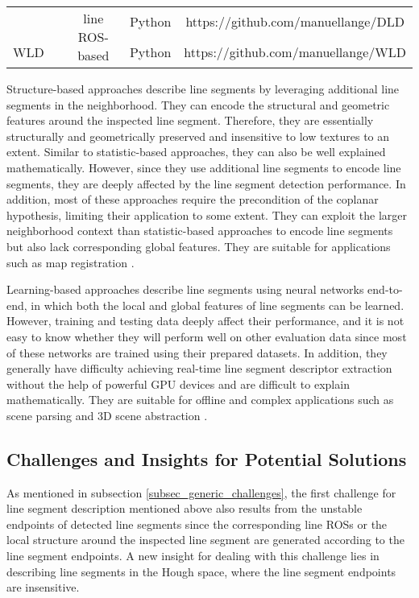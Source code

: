 \documentclass[journal,compsoc]{IEEEtran}
\begin{document}
\begin{table*}[tbp]
\begin{tabular}{|c|c|c|c|c|}
                                           &                                  & \multirow{2}{*}{line ROS-based}          & Python                   & https://github.com/manuellange/DLD                       \\ \cline{1-1} \cline{4-5}  		WLD  \cite{WLD}                                                                                       &                                  &                                          & Python                   & https://github.com/manuellange/WLD                       \\ \hline 	
	\end{tabular}%
	\label{line_description_implementation} 
\end{table*}

Structure-based approaches describe line segments by leveraging additional line segments in the neighborhood. They can encode the structural and geometric features around the inspected line segment. Therefore, they are essentially structurally and geometrically preserved and insensitive to low textures to an extent. Similar to statistic-based approaches, they can also be well explained mathematically. However, since they use additional line segments to encode line segments, they are deeply affected by the line segment detection performance. In addition, most of these approaches require the precondition of the coplanar hypothesis, limiting their application to some extent. They can exploit the larger neighborhood context than statistic-based approaches to encode line segments but also lack corresponding global features. They are suitable for applications such as map registration \cite{NovelSimilarityInvariantLineDescriptorandMatchingAlgorithmforGlobalMotionEstimation}.

Learning-based approaches describe line segments using neural networks end-to-end, in which both the local and global features of line segments can be learned. However, training and testing data deeply affect their performance, and it is not easy to know whether they will perform well on other evaluation data since most of these networks are trained using their prepared datasets. In addition, they generally have difficulty achieving real-time line segment descriptor extraction without the help of powerful GPU devices and are difficult to explain mathematically. They are suitable for offline and complex applications such as scene parsing \cite{6619245} and 3D scene abstraction \cite{HOFER2017167}.


\subsection{Challenges and Insights for Potential Solutions}
\label{subsec_description_challenges}
As mentioned in subsection \ref{subsec_generic_challenges}, the first challenge for line segment description mentioned above also results from the unstable endpoints of detected line segments since the corresponding line ROSs or the local structure around the inspected line segment are generated according to the line segment endpoints. A new insight for dealing with this challenge lies in describing line segments in the Hough space, where the line segment endpoints are insensitive.
\end{document}
